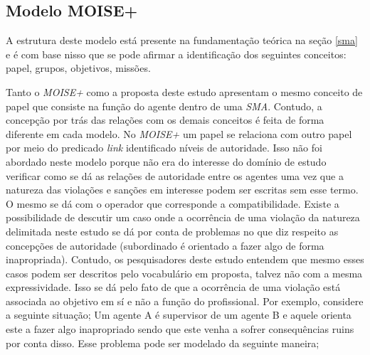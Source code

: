\subsection{Modelo MOISE+   }

A estrutura deste modelo está presente na fundamentação teórica na seção \ref{sma} e é com base nisso que se pode afirmar a identificação dos seguintes 
conceitos: papel, grupos, objetivos, missões. 

Tanto o \textit{MOISE+} como a proposta deste estudo apresentam o mesmo conceito de papel que consiste na função do agente dentro de uma \textit{SMA}. 
Contudo, a concepção por trás das relações com os demais conceitos é feita de forma diferente em cada modelo. No \textit{MOISE+} um papel se relaciona
com outro papel por meio do predicado \textit{link} identificado níveis de autoridade. Isso não foi abordado neste modelo porque não era do interesse 
do domínio de estudo verificar como se dá as relações de autoridade entre os agentes uma vez que a natureza das violações e sanções em interesse podem 
ser escritas sem esse termo. O mesmo se dá com o operador que corresponde a compatibilidade. Existe a possibilidade de descutir um caso onde a ocorrência 
de uma violação da natureza delimitada neste estudo se dá por conta de problemas no que diz respeito as concepções de autoridade (subordinado é orientado 
a fazer algo de forma inapropriada). Contudo, os pesquisadores deste estudo entendem que mesmo esses casos podem ser descritos pelo vocabulário em proposta,
talvez não com a mesma expressividade. Isso se dá pelo fato de que a ocorrência de uma violação está associada ao objetivo em sí e não a função do 
profissional. Por exemplo, considere a seguinte situação; Um agente A é supervisor de um agente B e aquele orienta este a fazer algo inapropriado sendo que 
este venha a sofrer consequências ruins por conta disso. Esse problema pode ser modelado da seguinte maneira;


